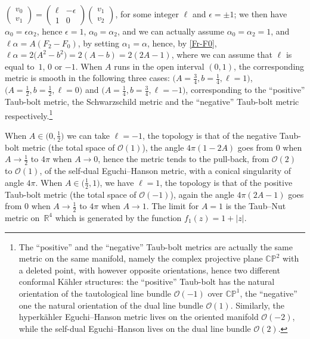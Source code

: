 \documentclass[10pt,a4paper]{amsart}
\numberwithin{equation}{section}
\begin{document}
 $\left(\begin{smallmatrix} v_0 \\ v_1\end{smallmatrix}\right) = \left(\begin{smallmatrix} \ell & - \epsilon \\ 1 & 0 \end{smallmatrix}\right) \left(\begin{smallmatrix} v_1 \\ v_2 \end{smallmatrix}\right)$, for some integer $\ell$ and $\epsilon = \pm 1$; we then have $\alpha _0 = \epsilon \alpha _2$, hence $\epsilon = 1$, $\alpha _0 = \alpha _2$, and we can actually assume $\alpha _0 = \alpha _2 = 1$, and $\ell \alpha = A (F _2 - F_0)$, by setting $\alpha _1 = \alpha$, hence, by \eqref{Fr-F0}, $\ell \alpha = 2 \big(A^2 - b^2\big) = 2 (A - b) = 2 (2 A - 1)$, where we can assume that $\ell$ is equal to~$1$, $0$ or $-1$. When $A$ runs in the open interval $(0, 1)$, the corresponding metric is smooth in the following three cases: $\big(A = \frac{3}{4}, b = \frac{1}{4}, \ell = 1\big)$, $\big(A = \frac{1}{2}, b = \frac{1}{2}, \ell = 0\big)$ and $\big(A = \frac{1}{4}, b = \frac{3}{4}, \ell = -1\big)$, corresponding to the ``positive'' Taub-bolt metric, the Schwarzschild metric and the ``negative'' Taub-bolt metric respectively.\footnote{The ``positive'' and the ``negative'' Taub-bolt metrics are actually the same metric on the same manifold, namely the complex projective plane $\mathbb{CP}^2$ with a deleted point, with however opposite orientations, hence two different conformal K\"ahler structures: the ``positive'' Taub-bolt has the natural orientation of the tautological line bundle $\mathcal{O}(-1)$ over $\mathbb{CP} ^1$, the ``negative'' one the natural orientation of the dual line bundle $\mathcal{O}(1)$. Similarly, the hyperk\"ahler Eguchi--Hanson metric lives on the oriented manifold $\mathcal{O} (- 2)$, while the self-dual Eguchi--Hanson lives on the dual line bundle $\mathcal{O}(2)$.}

 When $A\in\big(0,\frac12\big)$ we can take $\ell=-1$, the topology is that of the negative Taub-bolt metric (the total space of $\mathcal{O}(1)$), the angle $4\pi(1-2A)$ goes from $0$ when $A\rightarrow\frac12$ to $4\pi$ when $A\rightarrow0$, hence the metric tends to the pull-back, from $\mathcal{O}(2)$ to $\mathcal{O}(1)$, of the self-dual Eguchi--Hanson metric, with a conical singularity of angle $4 \pi$. When $A\in\big(\frac12,1\big)$, we have $\ell=1$, the topology is that of the positive Taub-bolt metric (the total space of $\mathcal{O}(-1)$), again the angle $4\pi(2A-1)$ goes from $0$ when $A\rightarrow\frac12$ to $4\pi$ when $A\rightarrow1$. The limit for $A=1$ is the Taub--Nut metric on~$\mathbb{R}^4$ which is generated by the function $f_1(z)=1+|z|$.
\end{document}
